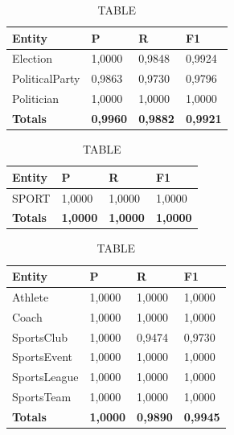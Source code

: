 \documentclass[thesis=M,english]{FITthesis}[2018/05/30]
\begin{document}
	\begin{table}[H]\centering
		\caption{TABLE}
		\label{}
		\begin{tabular}{|l|l|l|l|}
			\hline {\textbf{Entity}} & {\textbf{P}} & {\textbf{R}} & {\textbf{F1}}\\\hline
				Election & 1,0000 & 0,9848 & 0,9924\\
				PoliticalParty & 0,9863 & 0,9730 & 0,9796\\
				Politician & 1,0000 & 1,0000 & 1,0000\\\hline
				\textbf{Totals} & \textbf{0,9960} & \textbf{0,9882} & \textbf{0,9921}\\\hline
		\end{tabular}
	\end{table}
			
	
	\begin{table}[H]\centering
		\caption{TABLE}
		\label{}
		\begin{tabular}{|l|l|l|l|}
			\hline {\textbf{Entity}} & {\textbf{P}} & {\textbf{R}} & {\textbf{F1}}\\\hline
				SPORT & 1,0000 & 1,0000 & 1,0000\\\hline
				\textbf{Totals} & \textbf{1,0000} & \textbf{1,0000} & \textbf{1,0000}\\\hline
		\end{tabular}
	\end{table}

	\begin{table}[H]\centering
		\caption{TABLE}
		\label{}
		\begin{tabular}{|l|l|l|l|}
			\hline {\textbf{Entity}} & {\textbf{P}} & {\textbf{R}} & {\textbf{F1}}\\\hline
				Athlete & 1,0000 & 1,0000 & 1,0000\\
				Coach & 1,0000 & 1,0000 & 1,0000\\
				SportsClub & 1,0000 & 0,9474 & 0,9730\\
				SportsEvent & 1,0000 & 1,0000 & 1,0000\\
				SportsLeague & 1,0000 & 1,0000 & 1,0000\\
				SportsTeam & 1,0000 & 1,0000 & 1,0000\\\hline
				\textbf{Totals} & \textbf{1,0000} & \textbf{0,9890} & \textbf{0,9945}\\\hline
		\end{tabular}
	\end{table}	
\end{document}
